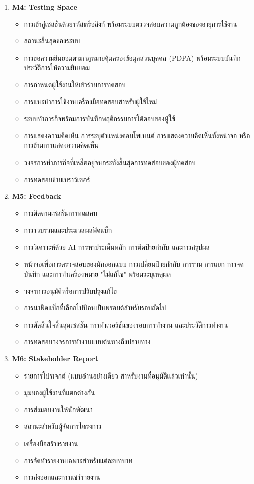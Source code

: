 \begin{enumerate}
  \item \textbf{M4: Testing Space}
    \begin{itemize}
      \item การเข้าสู่เซสชันด้วยรหัสหรือลิงก์ พร้อมระบบตรวจสอบความถูกต้องของอายุการใช้งาน
      \item สถานะสิ้นสุดของระบบ
      \item การขอความยินยอมตามกฎหมายคุ้มครองข้อมูลส่วนบุคคล (PDPA) พร้อมระบบบันทึกประวัติการให้ความยินยอม
      \item การกำหนดผู้ใช้งานให้เข้าร่วมการทดสอบ
      \item การแนะนำการใช้งานเครื่องมือทดสอบสำหรับผู้ใช้ใหม่
      \item ระบบทำภารกิจพร้อมการบันทึกพฤติกรรมการโต้ตอบของผู้ใช้
      \item การแสดงความคิดเห็น การระบุตำแหน่งคอมโพเนนต์ การแสดงความคิดเห็นทั้งหน้าจอ หรือการข้ามการแสดงความคิดเห็น
      \item วงจรการทำภารกิจที่เหลืออยู่จนกระทั่งสิ้นสุดการทดสอบของผู้ทดสอบ
      \item การทดสอบข้ามเบราว์เซอร์
    \end{itemize}

  \item \textbf{M5: Feedback}
    \begin{itemize}
      \item การติดตามเซสชันการทดสอบ
      \item การรวบรวมและประมวลผลฟีดแบ็ก
      \item การวิเคราะห์ด้วย AI การหาประเด็นหลัก การติดป้ายกำกับ และการสรุปผล
      \item หน้าจอเพื่อการตรวจสอบของนักออกแบบ การเปลี่ยนป้ายกำกับ การรวม การแยก การจดบันทึก และการทำเครื่องหมาย "ไม่แก้ไข" พร้อมระบุเหตุผล
      \item วงจรการอนุมัติหรือการปรับปรุงแก้ไข
      \item การนำฟีดแบ็กที่เลือกไปป้อนเป็นพรอมต์สำหรับรอบถัดไป
      \item การตัดสินใจสิ้นสุดเซสชัน การทำเวอร์ชันของรอบการทำงาน และประวัติการทำงาน
      \item การทดสอบวงจรการทำงานแบบต้นทางถึงปลายทาง
    \end{itemize}

  \item \textbf{M6: Stakeholder Report}
    \begin{itemize}
      \item รายการโปรเจกต์ (แบบอ่านอย่างเดียว สำหรับงานที่อนุมัติแล้วเท่านั้น)
      \item มุมมองผู้ใช้งานที่แตกต่างกัน
      \item การส่งมอบงานให้นักพัฒนา
      \item สถานะสำหรับผู้จัดการโครงการ
      \item เครื่องมือสร้างรายงาน
      \item การจัดทำรายงานเฉพาะสำหรับแต่ละบทบาท
      \item การส่งออกและการแชร์รายงาน
    \end{itemize}


\end{enumerate}
